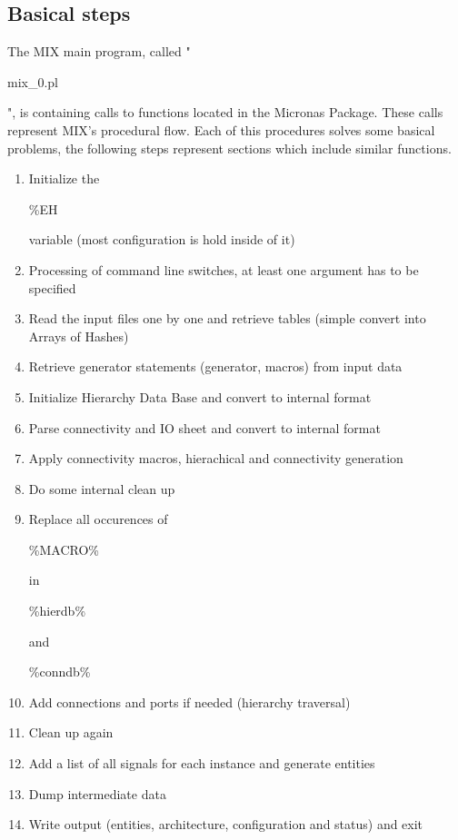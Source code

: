 \documentclass[a4paper,12pt]{article}
\begin{document}
\subsection{Basical steps}
The MIX main program, called "\begin{tt}mix\_0.pl\end{tt}", is containing calls to functions located in the Micronas Package. These calls represent MIX's procedural flow. Each of this procedures solves some basical problems, the following steps represent sections which include similar functions.
\begin{enumerate}
\item{Initialize the \begin{tt}\%EH\end{tt} variable (most configuration is hold inside of it)}
\item{Processing of command line switches, at least one argument has to be specified}
\item{Read the input files one by one and retrieve tables (simple convert into Arrays of Hashes)}
\item{Retrieve generator statements (generator, macros) from input data}
\item{Initialize Hierarchy Data Base and convert to internal format}
\item{Parse connectivity and IO sheet and convert to internal format}
\item{Apply connectivity macros, hierachical and connectivity generation}
\item{Do some internal clean up}
\item{Replace all occurences of \begin{tt}\%MACRO\%\end{tt} in \begin{tt}\%hierdb\%\end{tt} and \begin{tt}\%conndb\%\end{tt}}
\item{Add connections and ports if needed (hierarchy traversal)}
\item{Clean up again}
\item{Add a list of all signals for each instance and generate entities}
\item{Dump intermediate data}
\item{Write output (entities, architecture, configuration and status) and exit}
\end{enumerate}
\end{document}
